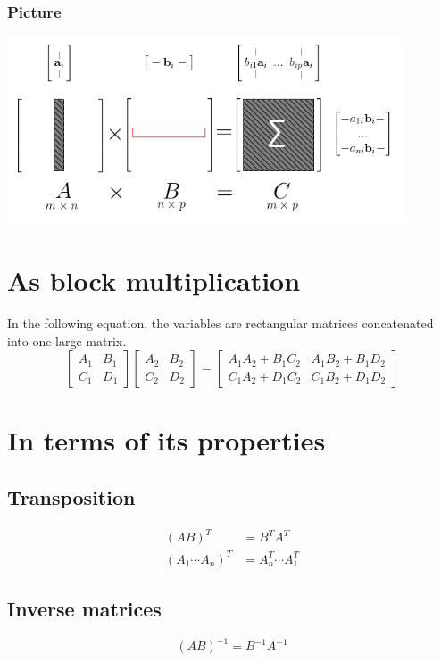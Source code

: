\documentclass{scrartcl}
\begin{document}
\subsubsection*{Picture}
\includegraphics[height=15em]{sum-of-outer-products.png}

\section{As block multiplication}
In the following equation, the variables are rectangular matrices concatenated into one large matrix.
\begin{equation*}
  \begin{bmatrix}
    A_1 & B_1 \\
    C_1 & D_1
  \end{bmatrix}
  \begin{bmatrix}
    A_2 & B_2 \\
    C_2 & D_2
  \end{bmatrix}
  =
  \begin{bmatrix}
    A_1A_2+B_1C_2 & A_1B_2+B_1D_2 \\
    C_1A_2+D_1C_2 & C_1B_2+D_1D_2
  \end{bmatrix}
\end{equation*}

\section{In terms of its properties}
\subsection{Transposition}
\begin{align*}
  (AB)^T &= B^TA^T\\
  (A_1 \dotsm A_n)^T &= A_n^T \dotsm A_1^T
\end{align*}

\subsection{Inverse matrices}
\begin{equation*}
  (AB)^{-1} = B^{-1}A^{-1}
\end{equation*}
\end{document}
